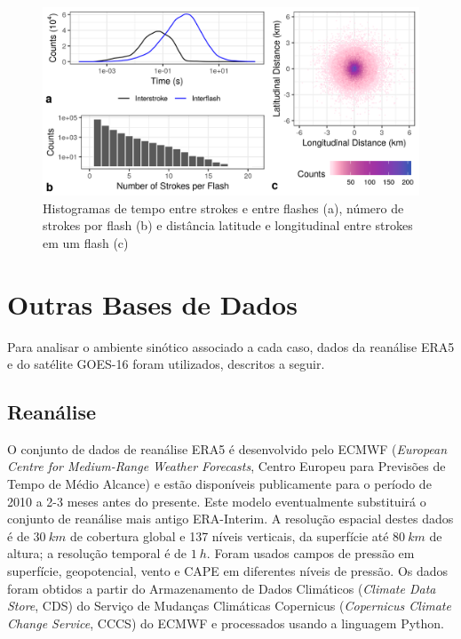 \begin{figure}[htb]
	\begin{center}
		\caption{Histogramas de tempo entre strokes e entre flashes (a), número de strokes por flash (b) e distância latitude e longitudinal entre strokes em um flash (c)} 
		\label{flash_stats}
		\includegraphics[width=\columnwidth]{../Lightning_Processing/figures/brasildat_flash_stats.png}
	\end{center}
\end{figure}

\section{Outras Bases de Dados}\label{outros_dados}

Para analisar o ambiente sinótico associado a cada caso, dados da reanálise ERA5 e do satélite GOES-16 foram utilizados, descritos a seguir.

\subsection{Reanálise} \label{era5}

O conjunto de dados de reanálise ERA5 \cite{Copernicus2017} é desenvolvido pelo ECMWF (\textit{European Centre for Medium-Range Weather Forecasts}, Centro Europeu para Previsões de Tempo de Médio Alcance) e estão disponíveis publicamente para o período de 2010 a 2-3 meses antes do presente. Este modelo eventualmente substituirá o conjunto de reanálise mais antigo ERA-Interim. A resolução espacial destes dados é de $30\:km$ de cobertura global e 137 níveis verticais, da superfície até $80\:km$ de altura; a resolução temporal é de $1\:h$. Foram usados campos de pressão em superfície, geopotencial, vento e CAPE em diferentes níveis de pressão. Os dados foram obtidos a partir do Armazenamento de Dados Climáticos (\textit{Climate Data Store}, CDS) do Serviço de Mudanças Climáticas Copernicus (\textit{Copernicus Climate Change Service}, CCCS) do ECMWF e processados usando a linguagem Python.

